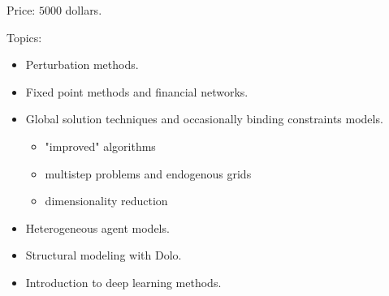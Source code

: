 \documentclass[12pt]{article}
\begin{document}
Price: $5000$ dollars.

Topics:
%
\begin{itemize}
    \item Perturbation methods.
    \item Fixed point methods and financial networks.
    \item Global solution techniques and occasionally binding constraints models.
    \begin{itemize}
        \item "improved" algorithms
        \item multistep problems and endogenous grids
        \item dimensionality reduction
    \end{itemize}
    \item Heterogeneous agent models.
    \item Structural modeling with Dolo.
    \item Introduction to deep learning methods.
\end{itemize}
\end{document}
